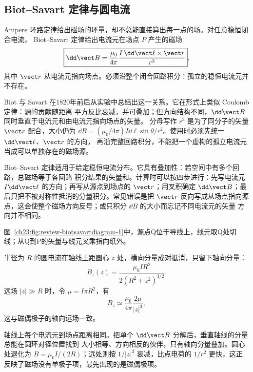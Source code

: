 \subsection{Biot--Savart 定律与圆电流}

Ampere 环路定律给出磁场的环量，却不总能直接算出每一点的场。对任意稳恒闭合电流，
Biot--Savart 定律给出电流元在场点 $P$ 产生的磁场
\begin{equation}
  \boxed{\dd\vect B=\frac{\mu_0}{4\pi}
  \frac{I\,\dd\vect\ell\times\vect r}{r^3}},
\end{equation}
其中 $\vect r$ 从电流元指向场点。必须沿整个闭合回路积分：孤立的稳恒电流元并不存在。

Biot 与 Savart 在1820年前后从实验中总结出这一关系。它在形式上类似 Coulomb 定律：源的贡献随距离
平方反比衰减，并可叠加；但方向结构不同，$\dd\vect B$ 同时垂直于电流元和由电流元指向场点的矢量。
分母写作 $r^3$ 是为了同分子的矢量 $\vect r$ 配合，大小仍为
$\dd B=(\mu_0/4\pi)I\dd\ell\sin\theta/r^2$。使用时必须先统一 $\dd\vect\ell$、$\vect r$ 的方向，
再沿完整回路积分，不能把一个虚构的孤立电流元当成可以单独存在的磁场源。

Biot--Savart 定律适用于给定稳恒电流分布。它具有叠加性：若空间中有多个回路，总磁场等于各回路
积分结果的矢量和。计算时可以按四步进行：先写电流元 $I\dd\vect\ell$ 的方向；再写从源点到场点的
$\vect r$；用叉积确定 $\dd\vect B$；最后只把不被对称性抵消的分量积分。常见错误是把 $\vect r$
反向写成从场点指向源点，这会使整个磁场方向反号；或只积分 $\dd B$ 的大小而忘记不同电流元的矢量
方向并不相同。

图~\ref{ch23:fig:review-biotsavartdiagram-1}中，源点Q位于导线上，线元取Q处切线；从Q到P的矢量与线元叉乘指向纸外。
\par\noindent\begin{minipage}{\linewidth}
\biotSavartDiagram
{}\label{ch23:fig:review-biotsavartdiagram-1}
\end{minipage}\par\medskip

半径为 $R$ 的圆电流在轴线上距圆心 $z$ 处，横向分量成对抵消，只留下轴向分量：
\begin{equation}
  \boxed{B_z(z)=\frac{\mu_0IR^2}{2(R^2+z^2)^{3/2}}}.
\end{equation}
远场 $|z|\gg R$ 时，令 $\mu=I\pi R^2$，有
\begin{equation}
  B_z\simeq\frac{\mu_0}{4\pi}\frac{2\mu}{|z|^3},
\end{equation}
这与磁偶极子的轴向远场一致。

轴线上每个电流元到场点距离相同。把单个 $\dd\vect B$ 分解后，垂直轴线的分量总能在圆环对径位置找到
大小相等、方向相反的伙伴，只有轴向分量叠加。圆心处退化为 $B=\mu_0I/(2R)$；远处则按 $1/|z|^3$
衰减，比点电荷的 $1/r^2$ 更快，这正反映了磁场没有单极子项，最先出现的是磁偶极项。


